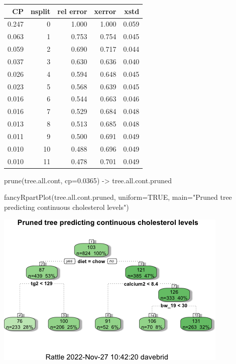 \documentclass[
]{article}
\newenvironment{Shaded}{\begin{snugshade}}{\end{snugshade}}
\newcommand{\AttributeTok}[1]{\textcolor[rgb]{0.77,0.63,0.00}{#1}}
\newcommand{\CommentTok}[1]{\textcolor[rgb]{0.56,0.35,0.01}{\textit{#1}}}
\newcommand{\ConstantTok}[1]{\textcolor[rgb]{0.00,0.00,0.00}{#1}}
\newcommand{\FloatTok}[1]{\textcolor[rgb]{0.00,0.00,0.81}{#1}}
\newcommand{\FunctionTok}[1]{\textcolor[rgb]{0.00,0.00,0.00}{#1}}
\newcommand{\NormalTok}[1]{#1}
\newcommand{\OtherTok}[1]{\textcolor[rgb]{0.56,0.35,0.01}{#1}}
\newcommand{\SpecialCharTok}[1]{\textcolor[rgb]{0.00,0.00,0.00}{#1}}
\newcommand{\StringTok}[1]{\textcolor[rgb]{0.31,0.60,0.02}{#1}}
\begin{document}
\begin{Shaded}
\end{Shaded}

\begin{longtable}[]{@{}rrrrr@{}}
\toprule()
CP & nsplit & rel error & xerror & xstd \\
\midrule()
\endhead
0.247 & 0 & 1.000 & 1.000 & 0.059 \\
0.063 & 1 & 0.753 & 0.754 & 0.045 \\
0.059 & 2 & 0.690 & 0.717 & 0.044 \\
0.037 & 3 & 0.630 & 0.636 & 0.040 \\
0.026 & 4 & 0.594 & 0.648 & 0.045 \\
0.023 & 5 & 0.568 & 0.639 & 0.045 \\
0.016 & 6 & 0.544 & 0.663 & 0.046 \\
0.016 & 7 & 0.529 & 0.684 & 0.048 \\
0.013 & 8 & 0.513 & 0.685 & 0.048 \\
0.011 & 9 & 0.500 & 0.691 & 0.049 \\
0.010 & 10 & 0.488 & 0.696 & 0.049 \\
0.010 & 11 & 0.478 & 0.701 & 0.049 \\
\bottomrule()
\end{longtable}

\begin{Shaded}
\begin{Highlighting}[]
\FunctionTok{prune}\NormalTok{(tree.all.cont, }\AttributeTok{cp=}\FloatTok{0.0365}\NormalTok{) }\OtherTok{{-}\textgreater{}}\NormalTok{ tree.all.cont.pruned}

\FunctionTok{fancyRpartPlot}\NormalTok{(tree.all.cont.pruned, }\AttributeTok{uniform=}\ConstantTok{TRUE}\NormalTok{, }\AttributeTok{main=}\StringTok{"Pruned tree predicting continuous cholesterol levels"}\NormalTok{)}
\end{Highlighting}
\end{Shaded}

\includegraphics{figures/full-tree-3.png}
\end{document}
